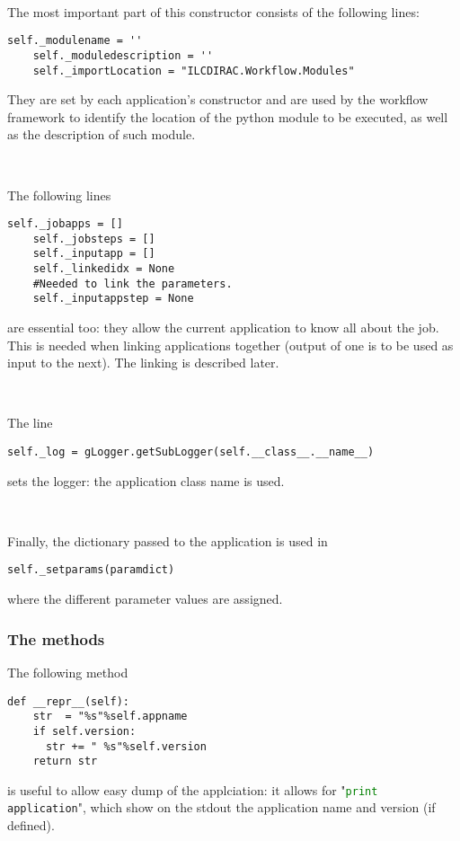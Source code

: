 \documentclass[a4paper,12pt]{article}
\begin{document}
~

The most important part of this constructor consists of the following lines:
\begin{lstlisting}[firstnumber=73]
    self._modulename = ''
    self._moduledescription = ''
    self._importLocation = "ILCDIRAC.Workflow.Modules" 
\end{lstlisting}
They are set by each application's constructor and are used by the workflow
framework to identify the location of the python module to be executed, as well
as the description of such module. 

~

The following lines
\begin{lstlisting}[firstnumber=81]
    self._jobapps = []
    self._jobsteps = []
    self._inputapp = []
    self._linkedidx = None
    #Needed to link the parameters.
    self._inputappstep = None
\end{lstlisting}
are essential too: they allow the current application to know all about the job.
This is needed when linking applications together (output of one is to be used
as input to the next). The linking is described later.

~

The line
\begin{lstlisting}[firstnumber=93]
    self._log = gLogger.getSubLogger(self.__class__.__name__)
\end{lstlisting}
sets the logger: the application class name is used.

~

Finally, the dictionary passed to the application is used in
\begin{lstlisting}[firstnumber=97]
    self._setparams(paramdict)
\end{lstlisting}
where the different parameter values are assigned. 

\subsubsection{The methods}
The following method
\begin{lstlisting}[firstnumber=99]
  def __repr__(self):
    str  = "%s"%self.appname
    if self.version:
      str += " %s"%self.version
    return str
\end{lstlisting}
is useful to allow easy dump of the applciation: it allows for 
"\lstinline[language=python]!print application!", 
which show on the stdout the application name and version (if defined).
\end{document}

